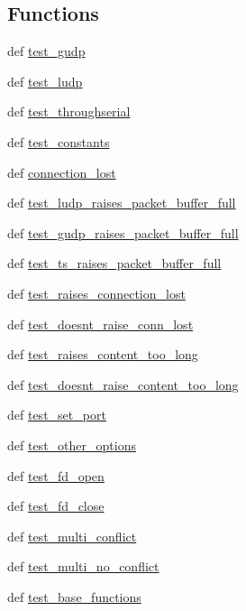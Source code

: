 \subsection*{Functions}
\begin{DoxyCompactItemize}
\item 
def \hyperlink{namespacetest_1_1test_affc6581508551ad868ceda18f3ab2fbf}{test\-\_\-gudp}
\item 
def \hyperlink{namespacetest_1_1test_a94842839efe3b21022d22c6d47431d67}{test\-\_\-ludp}
\item 
def \hyperlink{namespacetest_1_1test_ae570fd9dc22c325678df9950f727ded1}{test\-\_\-throughserial}
\item 
def \hyperlink{namespacetest_1_1test_a222a5aa76c6b269e6823e72363a9e69d}{test\-\_\-constants}
\item 
def \hyperlink{namespacetest_1_1test_a3e5587e440ee60bd9e9f026957ef53ac}{connection\-\_\-lost}
\item 
def \hyperlink{namespacetest_1_1test_a9cb9923443838439fa3c1edaf2e41d7a}{test\-\_\-ludp\-\_\-raises\-\_\-packet\-\_\-buffer\-\_\-full}
\item 
def \hyperlink{namespacetest_1_1test_a8d40e34845a7b08c61a750347b865f9c}{test\-\_\-gudp\-\_\-raises\-\_\-packet\-\_\-buffer\-\_\-full}
\item 
def \hyperlink{namespacetest_1_1test_aa397c85b079a5f08e9b1a09039f40faa}{test\-\_\-ts\-\_\-raises\-\_\-packet\-\_\-buffer\-\_\-full}
\item 
def \hyperlink{namespacetest_1_1test_aed702642c8e3b1885dac071ce468d5a6}{test\-\_\-raises\-\_\-connection\-\_\-lost}
\item 
def \hyperlink{namespacetest_1_1test_a441032bdc393a2f97e8fbb3d07134c38}{test\-\_\-doesnt\-\_\-raise\-\_\-conn\-\_\-lost}
\item 
def \hyperlink{namespacetest_1_1test_af224357bfb87689b347e0c327003f57c}{test\-\_\-raises\-\_\-content\-\_\-too\-\_\-long}
\item 
def \hyperlink{namespacetest_1_1test_a88e12fed24f36a84259697070da90175}{test\-\_\-doesnt\-\_\-raise\-\_\-content\-\_\-too\-\_\-long}
\item 
def \hyperlink{namespacetest_1_1test_a54f6072931b2dba1033e696e968b03d4}{test\-\_\-set\-\_\-port}
\item 
def \hyperlink{namespacetest_1_1test_a5add99ae69fd7c723730a548a73b61d9}{test\-\_\-other\-\_\-options}
\item 
def \hyperlink{namespacetest_1_1test_a4fa3f5c332f904314864dda770454707}{test\-\_\-fd\-\_\-open}
\item 
def \hyperlink{namespacetest_1_1test_a4a4058794c9eb1c211ed193251e286a8}{test\-\_\-fd\-\_\-close}
\item 
def \hyperlink{namespacetest_1_1test_a450c4f8f71bf5160a2c47ea69105fe55}{test\-\_\-multi\-\_\-conflict}
\item 
def \hyperlink{namespacetest_1_1test_a93122ebd19eef0c3e0cf563a5ff7d95a}{test\-\_\-multi\-\_\-no\-\_\-conflict}
\item 
def \hyperlink{namespacetest_1_1test_aed1bb8fba600acad2dace04dc456c409}{test\-\_\-base\-\_\-functions}
\end{DoxyCompactItemize}
